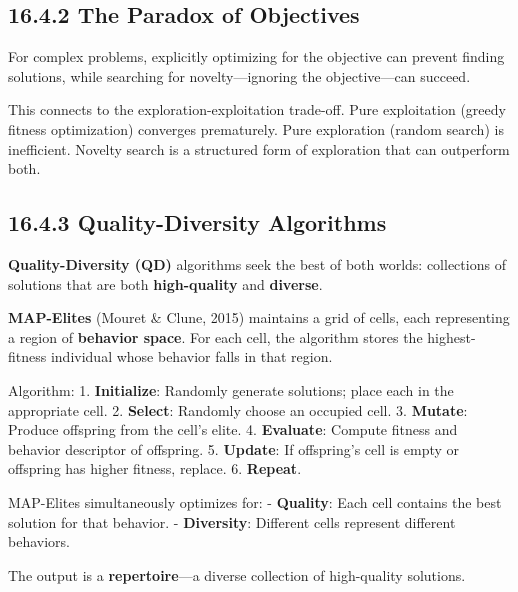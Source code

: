 \subsection{16.4.2 The Paradox of Objectives}

\begin{observation}
For complex problems, explicitly optimizing for the objective can prevent finding solutions, while searching for novelty---ignoring the objective---can succeed.

This connects to the exploration-exploitation trade-off. Pure exploitation (greedy fitness optimization) converges prematurely. Pure exploration (random search) is inefficient. Novelty search is a structured form of exploration that can outperform both.
\end{observation}

\subsection{16.4.3 Quality-Diversity Algorithms}

\textbf{Quality-Diversity (QD)} algorithms seek the best of both worlds: collections of solutions that are both \textbf{high-quality} and \textbf{diverse}.

\begin{definition}
\textbf{MAP-Elites} (Mouret \& Clune, 2015) maintains a grid of cells, each representing a region of \textbf{behavior space}. For each cell, the algorithm stores the highest-fitness individual whose behavior falls in that region.

Algorithm:
1. \textbf{Initialize}: Randomly generate solutions; place each in the appropriate cell.
2. \textbf{Select}: Randomly choose an occupied cell.
3. \textbf{Mutate}: Produce offspring from the cell's elite.
4. \textbf{Evaluate}: Compute fitness and behavior descriptor of offspring.
5. \textbf{Update}: If offspring's cell is empty or offspring has higher fitness, replace.
6. \textbf{Repeat}.
\end{definition}

\begin{proposition}
MAP-Elites simultaneously optimizes for:
- \textbf{Quality}: Each cell contains the best solution for that behavior.
- \textbf{Diversity}: Different cells represent different behaviors.

The output is a \textbf{repertoire}---a diverse collection of high-quality solutions.
\end{proposition}

